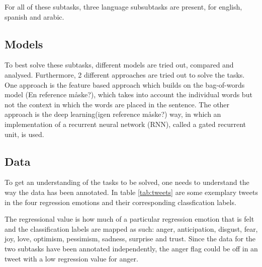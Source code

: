For all of these subtasks, three language subsubtasks are present, for english, spanish and arabic.\\ 
\subsection{Models}
To best solve these subtasks, different models are tried out, compared and analysed. Furthermore, 2 different approaches are tried out to solve the tasks. One approach is the feature based approach which builds on the bag-of-words model (En reference måske?), which takes into account the individual words but not the context in which the words are placed in the sentence. The other approach is the deep learning(igen reference måske?) way, in which an implementation of a recurrent neural network (RNN), called a gated recurrent unit, is used.

\subsection{Data}
To get an understanding of the tasks to be solved, one needs to understand the way the data has been annotated. In table \ref{tab:tweets} are some exemplary tweets in the four regression emotions and their corresponding classfication labels.\\
\begin{table}[h]
\caption{Exemplary tweets with regression and clasification labels}
\label{tab:tweets}
\end{table}
The regressional value is how much of a particular regression emotion that is felt and the classification labels are mapped as such: anger, anticipation, disgust, fear, joy, love, optimism, pessimism, sadness, surprise and trust. Since the data for the two subtasks have been annotated independently, the anger flag could be off in an tweet with a low regression value for anger. 